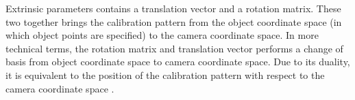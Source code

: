 \documentclass[a4paper,12pt]{report}%
\begin{document}
\begin{appendices}
\begin{enumerate}
		Extrinsic parameters contains a translation vector and a rotation matrix. These two together brings the calibration pattern from the object coordinate space (in which object points are specified) to the camera coordinate space. In more technical terms, the rotation matrix and translation vector performs a change of basis from object coordinate space to camera coordinate space. Due to its duality, it is equivalent to the position of the calibration pattern with respect to the camera coordinate space \cite{backproject:_nodate-1}.\\
		
		\begin{figure}[h]
			\centering
\end{figure}
\end{enumerate}
\end{appendices}
\end{document}
